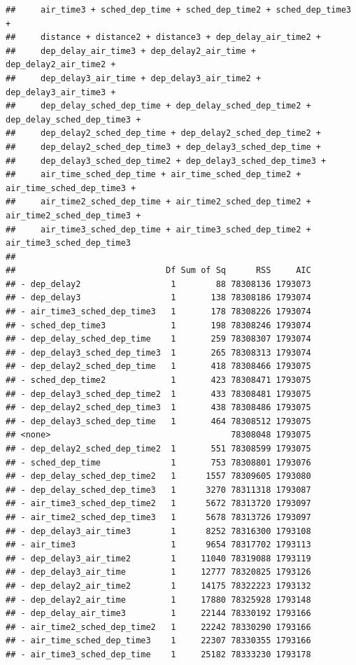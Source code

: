 \documentclass[
]{article}
\begin{document}
\begin{verbatim}
##     air_time3 + sched_dep_time + sched_dep_time2 + sched_dep_time3 + 
##     distance + distance2 + distance3 + dep_delay_air_time2 + 
##     dep_delay_air_time3 + dep_delay2_air_time + dep_delay2_air_time2 + 
##     dep_delay3_air_time + dep_delay3_air_time2 + dep_delay3_air_time3 + 
##     dep_delay_sched_dep_time + dep_delay_sched_dep_time2 + dep_delay_sched_dep_time3 + 
##     dep_delay2_sched_dep_time + dep_delay2_sched_dep_time2 + 
##     dep_delay2_sched_dep_time3 + dep_delay3_sched_dep_time + 
##     dep_delay3_sched_dep_time2 + dep_delay3_sched_dep_time3 + 
##     air_time_sched_dep_time + air_time_sched_dep_time2 + air_time_sched_dep_time3 + 
##     air_time2_sched_dep_time + air_time2_sched_dep_time2 + air_time2_sched_dep_time3 + 
##     air_time3_sched_dep_time + air_time3_sched_dep_time2 + air_time3_sched_dep_time3
## 
##                              Df Sum of Sq      RSS     AIC
## - dep_delay2                  1        88 78308136 1793073
## - dep_delay3                  1       138 78308186 1793074
## - air_time3_sched_dep_time3   1       178 78308226 1793074
## - sched_dep_time3             1       198 78308246 1793074
## - dep_delay_sched_dep_time    1       259 78308307 1793074
## - dep_delay3_sched_dep_time3  1       265 78308313 1793074
## - dep_delay2_sched_dep_time   1       418 78308466 1793075
## - sched_dep_time2             1       423 78308471 1793075
## - dep_delay3_sched_dep_time2  1       433 78308481 1793075
## - dep_delay2_sched_dep_time3  1       438 78308486 1793075
## - dep_delay3_sched_dep_time   1       464 78308512 1793075
## <none>                                    78308048 1793075
## - dep_delay2_sched_dep_time2  1       551 78308599 1793075
## - sched_dep_time              1       753 78308801 1793076
## - dep_delay_sched_dep_time2   1      1557 78309605 1793080
## - dep_delay_sched_dep_time3   1      3270 78311318 1793087
## - air_time3_sched_dep_time2   1      5672 78313720 1793097
## - air_time2_sched_dep_time3   1      5678 78313726 1793097
## - dep_delay3_air_time3        1      8252 78316300 1793108
## - air_time3                   1      9654 78317702 1793113
## - dep_delay3_air_time2        1     11040 78319088 1793119
## - dep_delay3_air_time         1     12777 78320825 1793126
## - dep_delay2_air_time2        1     14175 78322223 1793132
## - dep_delay2_air_time         1     17880 78325928 1793148
## - dep_delay_air_time3         1     22144 78330192 1793166
## - air_time2_sched_dep_time2   1     22242 78330290 1793166
## - air_time_sched_dep_time3    1     22307 78330355 1793166
## - air_time3_sched_dep_time    1     25182 78333230 1793178

\end{verbatim}
\end{document}
